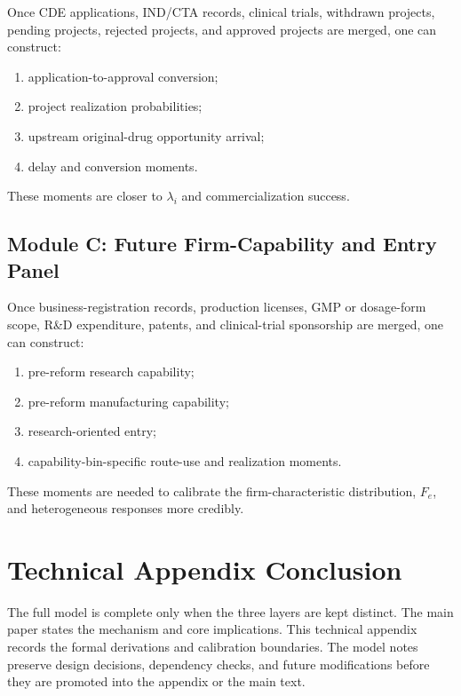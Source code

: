 \documentclass[12pt]{article}
\newcommand{\1}{\mathbf{1}}
\begin{document}
Once CDE applications, IND/CTA records, clinical trials, withdrawn projects, pending projects, rejected projects, and approved projects are merged, one can construct:
\begin{enumerate}[leftmargin=2em]
    \item application-to-approval conversion;
    \item project realization probabilities;
    \item upstream original-drug opportunity arrival;
    \item delay and conversion moments.
\end{enumerate}
These moments are closer to $\lambda_i$ and commercialization success.

\subsection{Module C: Future Firm-Capability and Entry Panel}

Once business-registration records, production licenses, GMP or dosage-form scope, R\&D expenditure, patents, and clinical-trial sponsorship are merged, one can construct:
\begin{enumerate}[leftmargin=2em]
    \item pre-reform research capability;
    \item pre-reform manufacturing capability;
    \item research-oriented entry;
    \item capability-bin-specific route-use and realization moments.
\end{enumerate}
These moments are needed to calibrate the firm-characteristic distribution, $F_e$, and heterogeneous responses more credibly.

\section{Technical Appendix Conclusion}

The full model is complete only when the three layers are kept distinct. The main paper states the mechanism and core implications. This technical appendix records the formal derivations and calibration boundaries. The model notes preserve design decisions, dependency checks, and future modifications before they are promoted into the appendix or the main text.

\clearpage


\end{document}
